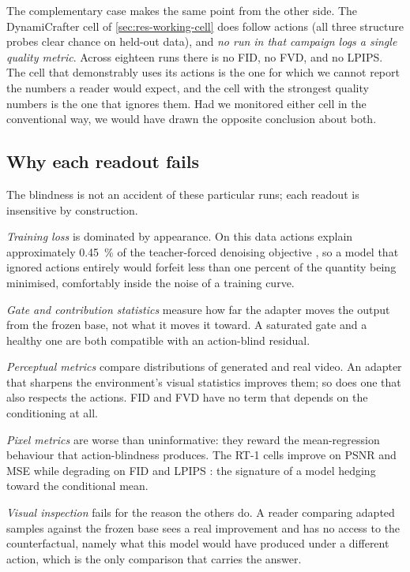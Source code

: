 The complementary case makes the same point from the other side. The
DynamiCrafter cell of \cref{sec:res-working-cell} does follow actions (all
three structure probes clear chance on held-out data), and \emph{no run in
that campaign logs a single quality metric}. Across eighteen runs there is
no FID, no FVD, and no LPIPS. The cell that demonstrably uses its actions is
the one for which we cannot report the numbers a reader would expect, and
the cell with the strongest quality numbers is the one that ignores them.
Had we monitored either cell in the conventional way, we would have drawn
the opposite conclusion about both.

\subsection{Why each readout fails}

The blindness is not an accident of these particular runs; each readout is
insensitive by construction.

\emph{Training loss} is dominated by appearance. On this data actions
explain approximately \SI{0.45}{\percent} of the teacher-forced denoising
objective , so a model that ignored actions entirely
would forfeit less than one percent of the quantity being minimised,
comfortably inside the noise of a training curve.

\emph{Gate and contribution statistics} measure how far the adapter moves
the output from the frozen base, not what it moves it toward. A saturated
gate and a healthy one are both compatible with an action-blind residual.

\emph{Perceptual metrics} compare distributions of generated and real video.
An adapter that sharpens the environment's visual statistics improves them;
so does one that also respects the actions. FID and FVD have no term that
depends on the conditioning at all.

\emph{Pixel metrics} are worse than uninformative: they reward the
mean-regression behaviour that action-blindness produces. The RT-1 cells
improve on PSNR and MSE while degrading on FID and LPIPS
: the signature of a model hedging toward the
conditional mean.

\emph{Visual inspection} fails for the reason the others do. A reader
comparing adapted samples against the frozen base sees a real improvement
and has no access to the counterfactual, namely what this model would have
produced under a different action, which is the only comparison that
carries the answer.

